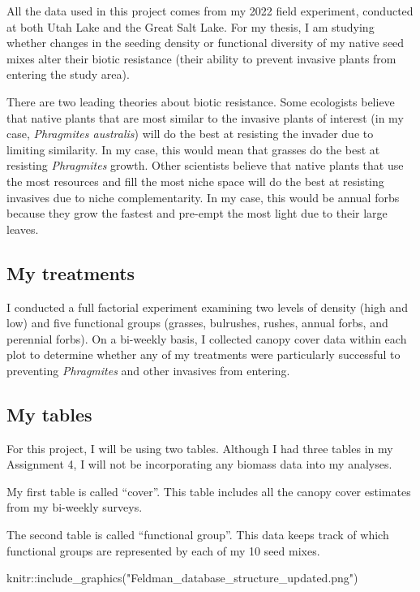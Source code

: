 \documentclass[
]{book}
\newenvironment{Shaded}{\begin{snugshade}}{\end{snugshade}}
\newcommand{\FunctionTok}[1]{\textcolor[rgb]{0.00,0.00,0.00}{#1}}
\newcommand{\NormalTok}[1]{#1}
\newcommand{\SpecialCharTok}[1]{\textcolor[rgb]{0.00,0.00,0.00}{#1}}
\newcommand{\StringTok}[1]{\textcolor[rgb]{0.31,0.60,0.02}{#1}}
\begin{document}
All the data used in this project comes from my 2022 field experiment, conducted at both Utah Lake and the Great Salt Lake. For my thesis, I am studying whether changes in the seeding density or functional diversity of my native seed mixes alter their biotic resistance (their ability to prevent invasive plants from entering the study area).

There are two leading theories about biotic resistance. Some ecologists believe that native plants that are most similar to the invasive plants of interest (in my case, \emph{Phragmites australis}) will do the best at resisting the invader due to limiting similarity. In my case, this would mean that grasses do the best at resisting \emph{Phragmites} growth. Other scientists believe that native plants that use the most resources and fill the most niche space will do the best at resisting invasives due to niche complementarity. In my case, this would be annual forbs because they grow the fastest and pre-empt the most light due to their large leaves.

\hypertarget{my-treatments}{%
\subsection{My treatments}\label{my-treatments}}

I conducted a full factorial experiment examining two levels of density (high and low) and five functional groups (grasses, bulrushes, rushes, annual forbs, and perennial forbs). On a bi-weekly basis, I collected canopy cover data within each plot to determine whether any of my treatments were particularly successful to preventing \emph{Phragmites} and other invasives from entering.

\hypertarget{my-tables}{%
\subsection{My tables}\label{my-tables}}

For this project, I will be using two tables. Although I had three tables in my Assignment 4, I will not be incorporating any biomass data into my analyses.

My first table is called ``cover''. This table includes all the canopy cover estimates from my bi-weekly surveys.

The second table is called ``functional group''. This data keeps track of which functional groups are represented by each of my 10 seed mixes.

\begin{Shaded}
\begin{Highlighting}[]
\NormalTok{knitr}\SpecialCharTok{::}\FunctionTok{include\_graphics}\NormalTok{(}\StringTok{"Feldman\_database\_structure\_updated.png"}\NormalTok{)}
\end{Highlighting}
\end{Shaded}
\end{document}

